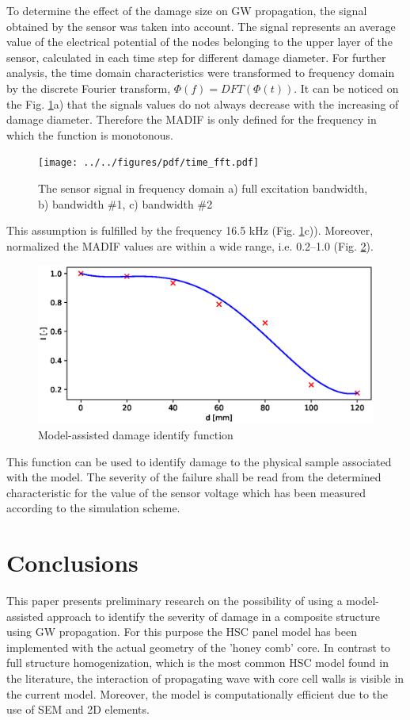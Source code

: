 \documentclass[materials,article,submit,moreauthors,pdftex]{Definitions/mdpi}
\begin{document}
{To determine the effect of the damage size on GW propagation, the signal obtained by the sensor was taken into account.
The signal represents an average value of the electrical potential of the nodes belonging to the upper layer of the sensor, calculated in each time step for different damage diameter.
For further analysis, the time domain characteristics were transformed to frequency domain by the discrete Fourier transform, \(\Phi(f)=DFT(\Phi(t))\).
It can be noticed on the Fig. \ref{fig:signals}a) that the signals values do not always decrease with the increasing of damage diameter.
Therefore the MADIF is only defined for the frequency in which the function is monotonous.
\begin{figure}
	\begin{center}
		\texttt{[image: ../../figures/pdf/time\_fft.pdf]}
	\end{center}
	\caption{The sensor signal in frequency domain a) full excitation bandwidth, b) bandwidth \#1, c) bandwidth \#2}
	\label{fig:signals}
\end{figure}
This assumption is fulfilled by the frequency 16.5 kHz (Fig. \ref{fig:signals}c)).
Moreover, normalized the MADIF values are within a wide range, i.e. 0.2--1.0 (Fig. \ref{fig:madif}).
\begin{figure}
	\begin{center}
		\includegraphics[width=1\linewidth]{../../figures/eps/madif.eps}
	\end{center}
	\caption{Model-assisted damage identify function}
	\label{fig:madif}
\end{figure}
This function can be used to identify damage to the physical sample associated with the model.
The severity of the failure shall be read from the determined characteristic for the value of the sensor voltage which has been measured according to the simulation scheme.
\section{Conclusions}
\label{sec:conc}
This paper presents preliminary research on the possibility of using a model-assisted approach to identify the severity of damage in a composite structure using GW propagation.
For this purpose the HSC panel model has been implemented with the actual geometry of the 'honey comb' core.
In contrast to  full structure homogenization, which is the most common HSC model found in the literature, the interaction of propagating wave with core cell walls is visible in the current model.
Moreover, the model is computationally efficient due to the use of SEM and 2D elements.

}
\end{document}
